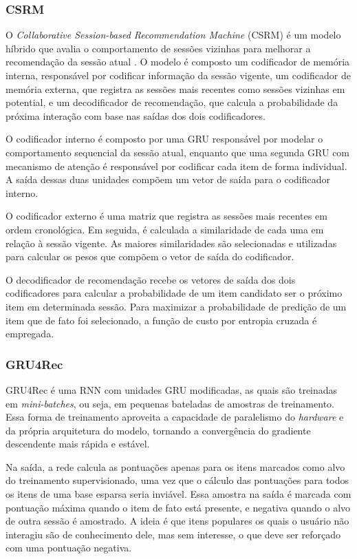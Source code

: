 \subsubsection{CSRM}
O \textit{Collaborative Session-based Recommendation Machine} (CSRM) é um modelo
híbrido que avalia o comportamento de sessões vizinhas para melhorar a
recomendação da sessão atual \cite{collaborative2018}. O modelo é composto um
codificador de memória interna, responsável por codificar informação da sessão
vigente, um codificador de memória externa, que registra as sessões mais
recentes como sessões vizinhas em potential, e um decodificador de recomendação,
que calcula a probabilidade da próxima interação com base nas saídas dos dois
codificadores.

O codificador interno é composto por uma GRU responsável por modelar
o comportamento sequencial da sessão atual, enquanto que uma segunda GRU com
mecanismo de atenção é responsável por codificar cada item de forma individual.
A saída dessas duas unidades compõem um vetor de saída para o codificador interno.

O codificador externo é uma matriz que registra as sessões mais recentes em
ordem cronológica. Em seguida, é calculada a similaridade de cada uma em relação
à sessão vigente. As maiores similaridades são selecionadas e utilizadas para
calcular os pesos que compõem o vetor de saída do codificador.

O decodificador de recomendação recebe os vetores de saída dos dois
codificadores para calcular a probabilidade de um item candidato ser o próximo
item em determinada sessão. Para maximizar a probabilidade de predição de um
item que de fato foi selecionado, a função de custo por entropia cruzada é
empregada.

\subsubsection{GRU4Rec}
GRU4Rec  \cite{gru4rec_1, gru4rec_2} é uma RNN com unidades GRU modificadas, as
quais são treinadas em \textit{mini-batches}, ou seja, em pequenas bateladas de
amostras de treinamento. Essa forma de treinamento aproveita a capacidade de
paralelismo do \textit{hardware} e da própria arquitetura do modelo, tornando a
convergência do gradiente descendente mais rápida e estável.

Na saída, a rede calcula as pontuações apenas para os itens marcados como
alvo do treinamento supervisionado, uma vez que o cálculo das
pontuações para todos os itens de uma base esparsa seria inviável. Essa amostra
na saída é marcada com pontuação máxima quando o item de fato está presente, e
negativa quando o alvo de outra sessão é amostrado. A ideia é que itens
populares os quais o usuário não interagiu são de conhecimento dele, mas sem
interesse, o que deve ser reforçado com uma pontuação negativa.

